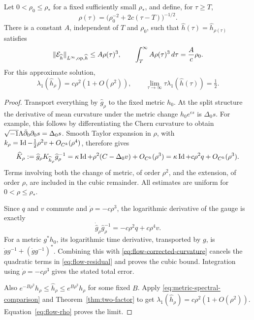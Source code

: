 \begin{lemma}\label{lem:flow-approximation}
Let $0<\rho_0\le\rho_*$ for a fixed sufficiently small $\rho_*$,
and define, for $\tau\ge T$,
\begin{equation}\label{eq:flow-rho}
 \rho(\tau)=\bigl(\rho_0^{-2}+2c(\tau-T)\bigr)^{-1/2}.
\end{equation}
There is a constant $A$, independent of $T$ and $\rho_0$, such that
$\widehat h(\tau)=\widehat h_{\rho(\tau)}$ satisfies
\begin{equation}\label{eq:flow-error-bound}
 \lVert\mathcal E_{\widehat h}\rVert_{L^\infty,\mathrm{op},\widehat h}
 \le A\rho(\tau)^3,
 \qquad
 \int_T^\infty A\rho(\tau)^3\,d\tau=\frac{A}{c}\rho_0.
\end{equation}
For this approximate solution,
\begin{equation}\label{eq:flow-approx-spectrum}
 \lambda_1(\widehat h_\rho)=c\rho^2(1+O(\rho^2)),\qquad
 \lim_{\tau\to\infty}\tau\lambda_1(\widehat h(\tau))=\tfrac12.
\end{equation}
\end{lemma}

\begin{proof}
Transport everything by $\widehat g_\rho$ to the fixed metric $h_0$.
At the split structure the derivative of mean curvature under the
metric change $h_0e^{\epsilon s}$ is $\Delta_0s$. For example, this
follows by differentiating the Chern curvature to obtain
$\sqrt{-1}\Lambda\bar\partial_0\partial_0s=\Delta_0s$.
Smooth Taylor expansion in $\rho$, with
$k_\rho=\operatorname{Id}-\tfrac12\rho^2v+O_{C^k}(\rho^4)$, therefore gives
\begin{equation}\label{eq:flow-corrected-curvature}
 \widehat K_\rho
 :=\widehat g_\rho K_{\widehat h_\rho}\widehat g_\rho^{-1}
 =\kappa\operatorname{Id}+\rho^2(C-\Delta_0v)+O_{C^k}(\rho^3)
 =\kappa\operatorname{Id}+c\rho^2q+O_{C^k}(\rho^3).
\end{equation}
Terms involving both the change of metric, of order $\rho^2$,
and the extension, of order $\rho$, are included in the cubic
remainder. All estimates are uniform for $0<\rho\le\rho_*$.

Since $q$ and $v$ commute and $\dot\rho=-c\rho^3$, the logarithmic
derivative of the gauge is exactly
\[
 \dot{\widehat g}_\rho\widehat g_\rho^{-1}
 =-c\rho^2q+c\rho^4v.
\]
For a metric $g^*h_0$, its logarithmic time derivative, transported
by $g$, is $\dot g g^{-1}+(\dot g g^{-1})^*$.
Combining this with \eqref{eq:flow-corrected-curvature} cancels the
quadratic terms in \eqref{eq:flow-residual} and proves the cubic
bound. Integration using $\dot\rho=-c\rho^3$ gives the stated
total error.

Also $e^{-B\rho^2}h_\rho\le\widehat h_\rho\le e^{B\rho^2}h_\rho$
for some fixed $B$. Apply \eqref{eq:metric-spectral-comparison}
and Theorem~\ref{thm:two-factor} to get
$\lambda_1(\widehat h_\rho)=c\rho^2(1+O(\rho^2))$.
Equation~\eqref{eq:flow-rho} proves the limit.
\end{proof}


